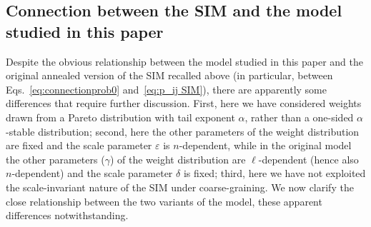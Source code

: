 \documentclass[11pt, reqno]{amsart}
\numberwithin{equation}{section}
\theoremstyle{plain} %
\theoremstyle{definition} %
\newcommand{\eps}{\varepsilon}
\begin{document}
\subsection{Connection between the SIM and the model studied in this paper} \label{3parag: Connection with the SIM}
Despite the obvious relationship between the model studied in this paper and the original annealed version of the SIM recalled above (in particular, between Eqs.~\eqref{eq:connectionprob0} and~\eqref{eq:p_ij SIM}), there are apparently some differences that require further discussion.
First, here we have considered weights drawn from a Pareto distribution with tail exponent $\alpha$, rather than a one-sided $\alpha$-stable distribution; second, here the other parameters of the weight distribution are fixed and the scale parameter $\eps$ is $n$-dependent, while in the original model the other parameters ($\gamma$) of the weight distribution are $\ell$-dependent (hence also $n$-dependent) and the scale parameter $\delta$ is fixed; third, here we have not exploited the scale-invariant nature of the SIM under coarse-graining. We now clarify the close relationship between the two variants of the model, these apparent differences notwithstanding.
\end{document}
